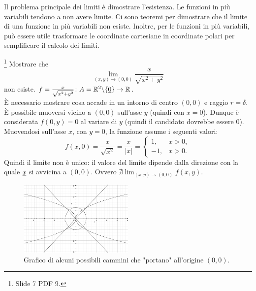 Il problema principale dei limiti è dimostrare l'esistenza. Le funzioni in più variabili tendono a non avere limite. Ci sono teoremi per dimostrare che il limite di una funzione in più variabili non esiste. Inoltre, per le funzioni in più variabili, può essere utile trasformare le coordinate cartesiane in coordinate polari per semplificare il calcolo dei limiti.

\begin{example}\footnote{Slide 7 PDF 9.}
    Mostrare che 
    \begin{equation*}
        \lim_{(x,y)\rightarrow(0,0)}\frac{x}{\sqrt{x^2+y^2}}
    \end{equation*}
    non esiste. $f=\frac{x}{\sqrt{x^2+y^2}}\colon A=\mathbb R^2\backslash\{\uline 0\}\rightarrow\mathbb R$.\\
    \footnotemark È necessario mostrare cosa accade in un intorno di centro $(0,0)$ e raggio $r=\delta$. È possibile muoversi vicino a $(0,0)$ sull'asse $y$ (quindi con $x=0$). Dunque è considerata $f(0,y)=0$ al variare di $y$ (quindi il candidato dovrebbe essere 0).\\
    Muovendosi sull'asse $x$, con $y=0$, la funzione assume i seguenti valori:
    \begin{equation}\label{eq:esempio_limiti_1}
        f(x,0)=\frac{x}{\sqrt{x^2}}=\frac{x}{|x|}=
        \begin{cases}
            1, & x>0,\\
            -1,& x>0.
        \end{cases}
    \end{equation}
    Quindi il limite non è unico: il valore del limite dipende dalla direzione con la quale $\uline x$ si avvicina a $(0,0)$. Ovvero $\nexists\lim_{(x,y)\rightarrow(0,0)}f(x,y)$.

    \begin{figure}
    \centering
    \includegraphics[width=0.5\textwidth]{Analisi2/figures/cammini_0,0.jpg}
    \caption{Grafico di alcuni possibili cammini che "portano" all'origine $(0,0)$.}\label{fig:cammini_0,0}
    \end{figure}
\end{example}

